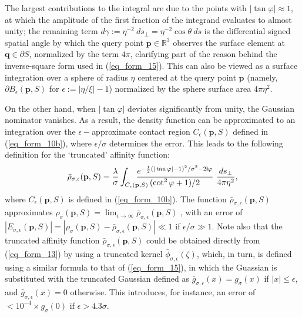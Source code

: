 \documentclass[article]{gmp2014}
\theoremstyle{definition}
\newcommand{\ii}{\text{\textsf{\textbf{i}}}}
\newcommand{\nquad}{\!\! \!\! \!\!}
\begin{document}
The largest contributions to the integral are due to the points with $|\tan \varphi| \approx 1$, at which the amplitude of the first fraction of the integrand evaluates to almost unity; the remaining term $d \gamma := \eta^{-2} ~d s_\bot = \eta^{-2} \cos \theta ~d s$ is the differential signed spatial angle by which the query point $\mathbf{p} \in \mathds{R}^3$ observes the surface element at $\mathbf{q} \in \partial S$, normalized by the term $4\pi$, clarifying part of the reason behind the inverse-square form used in (\ref{eq_form_15}). This can also be viewed as a surface integration over a sphere of radius $\eta$ centered at the query point $\mathbf{p}$ (namely, $\partial B_\epsilon(\mathbf{p}, S)$ for $\epsilon := |\eta/\xi| - 1$) normalized by the sphere surface area $4\pi \eta^2$.

On the other hand, when $|\tan \varphi|$ deviates significantly from unity, the Gaussian nominator vanishes. As a result, the density function can be approximated to an integration over the $\epsilon-$approximate contact region $C_\epsilon(\mathbf{p}, S)$ defined in (\ref{eq_form_10b}), where $\epsilon / \sigma$ determines the error. This leads to the following definition for the `truncated' affinity function:
%
\begin{equation}
    \bar{\rho}_{\sigma, \epsilon}(\mathbf{p}, S) = \frac{\lambda}{\sigma} \int_{C_\epsilon(\mathbf{p}, S)} \nquad \!\!\!\! \frac{e^{-\frac{1}{2}(|\tan \varphi| - 1)^2/\sigma^2 - 2 \ii \varphi}}{(\cot^2{\varphi} + 1)/2} ~ \frac{d s_\bot}{4\pi \eta^2}, \label{eq_form_17t}
\end{equation}
%
where $C_\epsilon(\mathbf{p}, S)$ is defined in (\ref{eq_form_10b}). The function $\bar{\rho}_{\sigma, \epsilon}(\mathbf{p}, S)$ approximates $\rho_\sigma(\mathbf{p}, S) = \lim_{\epsilon \to \infty} \bar{\rho}_{\sigma, \epsilon}(\mathbf{p}, S)$ , with an error of $|E_{\sigma, \epsilon}(\mathbf{p}, S)| = |\rho_\sigma(\mathbf{p}, S) - \bar{\rho}_{\sigma, \epsilon}(\mathbf{p}, S)| \ll 1$ if $\epsilon/\sigma \gg 1$.
%
Note also that the truncated affinity function $\bar{\rho}_{\sigma, \epsilon}(\mathbf{p}, S)$ could be obtained directly from (\ref{eq_form_13}) by using a truncated kernel $\bar{\phi}_{\sigma, \epsilon}(\zeta)$, which, in turn, is defined using a similar formula to that of (\ref{eq_form_15}), in which the Guassian is substituted with the truncated Gaussian defined as $\bar{g}_{\sigma, \epsilon}(x) = g_\sigma(x)$ if $|x| \leq \epsilon$, and $\bar{g}_{\sigma, \epsilon}(x) = 0$ otherwise. This introduces, for instance, an error of $< 10^{-4} \times g_\sigma(0)$ if $\epsilon > 4.3 \sigma$.
\end{document}
